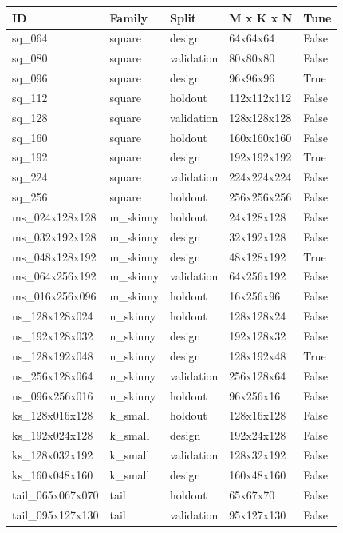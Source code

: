\begin{tabular}{lllll}
\toprule
ID & Family & Split & M x K x N & Tune \\
\midrule
sq\_064 & square & design & 64x64x64 & False \\
sq\_080 & square & validation & 80x80x80 & False \\
sq\_096 & square & design & 96x96x96 & True \\
sq\_112 & square & holdout & 112x112x112 & False \\
sq\_128 & square & validation & 128x128x128 & False \\
sq\_160 & square & holdout & 160x160x160 & False \\
sq\_192 & square & design & 192x192x192 & True \\
sq\_224 & square & validation & 224x224x224 & False \\
sq\_256 & square & holdout & 256x256x256 & False \\
ms\_024x128x128 & m\_skinny & holdout & 24x128x128 & False \\
ms\_032x192x128 & m\_skinny & design & 32x192x128 & False \\
ms\_048x128x192 & m\_skinny & design & 48x128x192 & True \\
ms\_064x256x192 & m\_skinny & validation & 64x256x192 & False \\
ms\_016x256x096 & m\_skinny & holdout & 16x256x96 & False \\
ns\_128x128x024 & n\_skinny & holdout & 128x128x24 & False \\
ns\_192x128x032 & n\_skinny & design & 192x128x32 & False \\
ns\_128x192x048 & n\_skinny & design & 128x192x48 & True \\
ns\_256x128x064 & n\_skinny & validation & 256x128x64 & False \\
ns\_096x256x016 & n\_skinny & holdout & 96x256x16 & False \\
ks\_128x016x128 & k\_small & holdout & 128x16x128 & False \\
ks\_192x024x128 & k\_small & design & 192x24x128 & False \\
ks\_128x032x192 & k\_small & validation & 128x32x192 & False \\
ks\_160x048x160 & k\_small & design & 160x48x160 & False \\
tail\_065x067x070 & tail & holdout & 65x67x70 & False \\
tail\_095x127x130 & tail & validation & 95x127x130 & False \\

\end{tabular}
